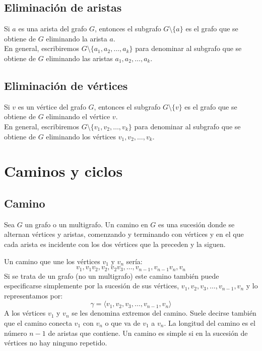 \subsection{Eliminación de aristas}

\begin{fondo}
Si $a$ es una arista del grafo $G$, entonces el subgrafo $G \setminus \{a\}$ es el grafo que se obtiene de $G$ eliminando la arista $a$.\\
En general, escribiremos $G \setminus \{a_1,a_2, \ldots, a_k\}$ para denominar al subgrafo que se obtiene de $G$ eliminando las aristas $a_1,a_2, \ldots, a_k$.
\end{fondo}

\subsection{Eliminación de vértices}

\begin{fondo}
Si $v$ es un vértice del grafo $G$, entonces el subgrafo $G \setminus \{v\}$ es el grafo que se obtiene de $G$ eliminando el vértice $v$.\\
En general, escribiremos $G \setminus \{v_1,v_2, \ldots, v_k\}$ para denominar al subgrafo que se obtiene de $G$ eliminando los vértices $v_1,v_2, \ldots, v_k$.
\end{fondo}

\section{Caminos y ciclos}

\subsection{Camino}

\begin{fondo}
Sea $G$ un grafo o un multigrafo. Un camino en $G$ es una sucesión donde se alternan vértices y aristas, comenzando y terminando con vértices y en el que cada arista es incidente con los dos vértices que la preceden y la siguen.
\end{fondo}

Un camino que une los vértices $v_1$ y $v_n$ sería:\\
\[v_1, v_1v_2, v_2, v_2v_3, \ldots, v_{n-1}, v_{n-1}v_n, v_n \]
Si se trata de un grafo (no un multigrafo) este camino también puede especificarse simplemente por la sucesión de sus vértices, $v_1, v_2, v_3, \ldots, v_{n-1}, v_n$ y lo representamos por:\\
\[ \gamma = \langle v_1, v_2, v_3, \ldots, v_{n-1}, v_n \rangle \]
A los vértices $v_1$ y $v_n$ se les denomina extremos del camino. Suele decirse también que el camino conecta $v_1$ con $v_n$ o que va de $v_1$ a $v_n$. La longitud del camino es el número $n-1$ de aristas que contiene. Un camino es simple si en la sucesión de vértices no hay ninguno repetido. \\

